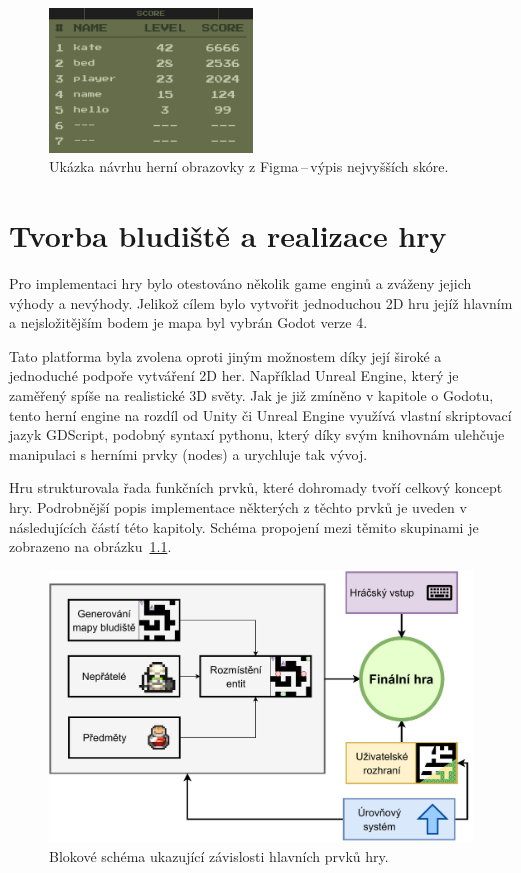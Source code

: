 \begin{figure}[H]
    \centering
    \includegraphics[width=0.48\textwidth]{obrazky-figures/ch3/Score_screen.png}
    \caption{Ukázka návrhu herní obrazovky z Figma\,--\,výpis nejvyšších skóre.}
    \label{fig:score_screen}
\end{figure}

\chapter{Tvorba bludiště a realizace hry} \label{chap:Generování herního bludiště a jeho prvků}
Pro implementaci hry bylo otestováno několik game enginů a zváženy jejich výhody a nevýhody. Jelikož cílem bylo vytvořit jednoduchou 2D hru jejíž hlavním a nejsložitějším bodem je mapa byl vybrán Godot verze 4. 

Tato platforma byla zvolena oproti jiným možnostem díky její široké a jednoduché podpoře vytváření 2D her. Například Unreal Engine, který je zaměřený spíše na realistické 3D světy. Jak je již zmíněno v kapitole o Godotu, tento herní engine na rozdíl od Unity či Unreal Engine využívá vlastní skriptovací jazyk GDScript, podobný syntaxí pythonu, který díky svým knihovnám ulehčuje manipulaci s herními prvky (nodes) a urychluje tak vývoj.

Hru strukturovala řada funkčních prvků, které dohromady tvoří celkový koncept hry. Podrobnější popis implementace některých z těchto prvků je uveden v následujících částí této kapitoly. Schéma propojení mezi těmito skupinami je zobrazeno na obrázku~\ref{fig:schema_hry}.

\begin{figure}[H]
    \centering
    \includegraphics[width=\textwidth]{obrazky-figures/ch4/blokove_schema_hry.pdf}
    \caption{Blokové schéma ukazující závislosti hlavních prvků hry.}
    \label{fig:schema_hry}
\end{figure}

